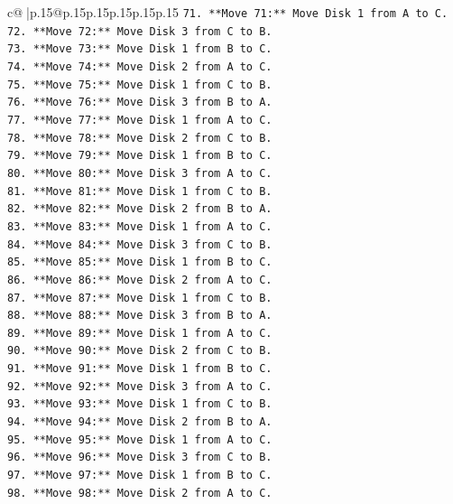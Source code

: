 \documentclass{article}
\begin{document}
{\begin{supertabular}{c@{$\;$}|p{.15\linewidth}@{}p{.15\linewidth}p{.15\linewidth}p{.15\linewidth}p{.15\linewidth}p{.15\linewidth}}
{{{\texttt{71. **Move 71:** Move Disk 1 from A to C.} \\
\texttt{72. **Move 72:** Move Disk 3 from C to B.} \\
\texttt{73. **Move 73:** Move Disk 1 from B to C.} \\
\texttt{74. **Move 74:** Move Disk 2 from A to C.} \\
\texttt{75. **Move 75:** Move Disk 1 from C to B.} \\
\texttt{76. **Move 76:** Move Disk 3 from B to A.} \\
\texttt{77. **Move 77:** Move Disk 1 from A to C.} \\
\texttt{78. **Move 78:** Move Disk 2 from C to B.} \\
\texttt{79. **Move 79:** Move Disk 1 from B to C.} \\
\texttt{80. **Move 80:** Move Disk 3 from A to C.} \\
\texttt{81. **Move 81:** Move Disk 1 from C to B.} \\
\texttt{82. **Move 82:** Move Disk 2 from B to A.} \\
\texttt{83. **Move 83:** Move Disk 1 from A to C.} \\
\texttt{84. **Move 84:** Move Disk 3 from C to B.} \\
\texttt{85. **Move 85:** Move Disk 1 from B to C.} \\
\texttt{86. **Move 86:** Move Disk 2 from A to C.} \\
\texttt{87. **Move 87:** Move Disk 1 from C to B.} \\
\texttt{88. **Move 88:** Move Disk 3 from B to A.} \\
\texttt{89. **Move 89:** Move Disk 1 from A to C.} \\
\texttt{90. **Move 90:** Move Disk 2 from C to B.} \\
\texttt{91. **Move 91:** Move Disk 1 from B to C.} \\
\texttt{92. **Move 92:** Move Disk 3 from A to C.} \\
\texttt{93. **Move 93:** Move Disk 1 from C to B.} \\
\texttt{94. **Move 94:** Move Disk 2 from B to A.} \\
\texttt{95. **Move 95:** Move Disk 1 from A to C.} \\
\texttt{96. **Move 96:** Move Disk 3 from C to B.} \\
\texttt{97. **Move 97:** Move Disk 1 from B to C.} \\
\texttt{98. **Move 98:** Move Disk 2 from A to C.} \\
}}}
\end{supertabular}}
\end{document}
